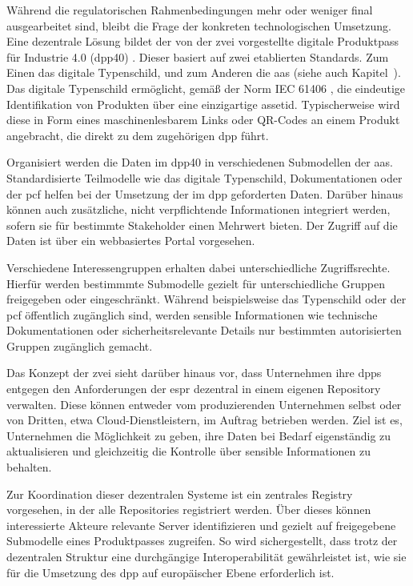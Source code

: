 Während die regulatorischen Rahmenbedingungen mehr oder weniger final ausgearbeitet sind, bleibt die Frage der konkreten technologischen Umsetzung.
Eine dezentrale Lösung bildet der von der \acs{zvei} vorgestellte digitale Produktpass für Industrie 4.0 (\acs{dpp40}) \cite{DPP40}.
Dieser basiert auf zwei etablierten Standards. 
Zum Einen das digitale Typenschild, und zum Anderen die \acs{aas} (siehe auch Kapitel~).
Das digitale Typenschild ermöglicht, gemäß der Norm IEC 61406 \cite{TypenschildIEC61406-1}, die eindeutige Identifikation von Produkten über eine einzigartige \acs{assetid}.
Typischerweise wird diese in Form eines maschinenlesbarem Links oder QR-Codes an einem Produkt angebracht, die direkt zu dem zugehörigen \acs{dpp} führt.

Organisiert werden die Daten im \acs{dpp40} in verschiedenen Submodellen der \acs{aas}. 
Standardisierte Teilmodelle wie das digitale Typenschild, Dokumentationen oder der \ac{pcf} helfen bei der Umsetzung der im \acs{dpp} geforderten Daten.
Darüber hinaus können auch zusätzliche, nicht verpflichtende Informationen integriert werden, sofern sie für bestimmte Stakeholder einen Mehrwert bieten.
Der Zugriff auf die Daten ist über ein webbasiertes Portal vorgesehen. 

Verschiedene Interessengruppen erhalten dabei unterschiedliche Zugriffsrechte. 
Hierfür werden bestimmmte Submodelle gezielt für unterschiedliche Gruppen freigegeben oder eingeschränkt.
Während beispielsweise das Typenschild oder der \acs{pcf} öffentlich zugänglich sind, werden sensible Informationen wie technische Dokumentationen oder sicherheitsrelevante Details nur bestimmten autorisierten Gruppen zugänglich gemacht.

Das Konzept der \acs{zvei} sieht darüber hinaus vor, dass Unternehmen ihre \acsp{dpp} entgegen den Anforderungen der \acs{espr} dezentral in einem eigenen Repository verwalten. 
Diese können entweder vom produzierenden Unternehmen selbst oder von Dritten, etwa Cloud-Dienstleistern, im Auftrag betrieben werden. 
Ziel ist es, Unternehmen die Möglichkeit zu geben, ihre Daten bei Bedarf eigenständig zu aktualisieren und gleichzeitig die Kontrolle über sensible Informationen zu behalten.

Zur Koordination dieser dezentralen Systeme ist ein zentrales Registry vorgesehen, in der alle Repositories registriert werden.
Über dieses können interessierte Akteure relevante Server identifizieren und gezielt auf freigegebene Submodelle eines Produktpasses zugreifen.
So wird sichergestellt, dass trotz der dezentralen Struktur eine durchgängige Interoperabilität gewährleistet ist, wie sie für die Umsetzung des \acs{dpp} auf europäischer Ebene erforderlich ist.


